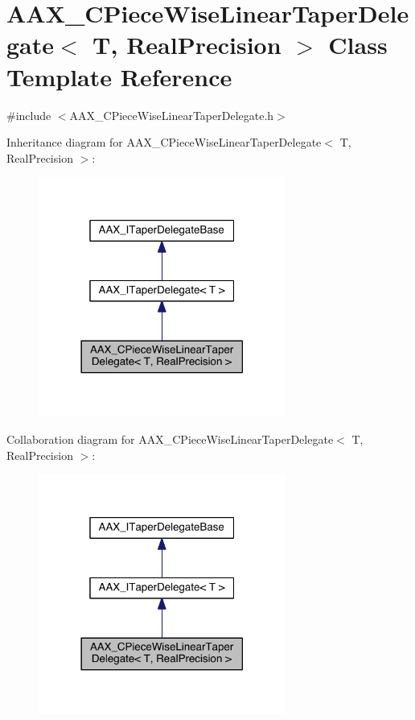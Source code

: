 \hypertarget{a00037}{}\section{A\+A\+X\+\_\+\+C\+Piece\+Wise\+Linear\+Taper\+Delegate$<$ T, Real\+Precision $>$ Class Template Reference}
\label{a00037}


{\ttfamily \#include $<$A\+A\+X\+\_\+\+C\+Piece\+Wise\+Linear\+Taper\+Delegate.\+h$>$}



Inheritance diagram for A\+A\+X\+\_\+\+C\+Piece\+Wise\+Linear\+Taper\+Delegate$<$ T, Real\+Precision $>$\+:
\nopagebreak
\begin{figure}[H]
\begin{center}
\leavevmode
\includegraphics[width=230pt]{a00458}
\end{center}
\end{figure}


Collaboration diagram for A\+A\+X\+\_\+\+C\+Piece\+Wise\+Linear\+Taper\+Delegate$<$ T, Real\+Precision $>$\+:
\nopagebreak
\begin{figure}[H]
\begin{center}
\leavevmode
\includegraphics[width=230pt]{a00459}
\end{center}
\end{figure}


